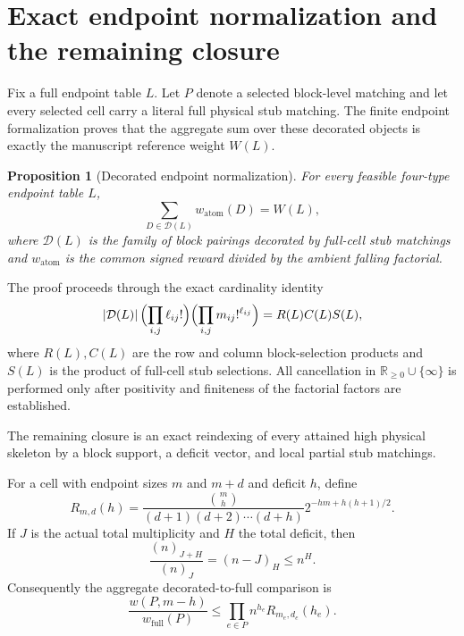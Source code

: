 \documentclass[11pt]{article}
\newtheorem{proposition}[theorem]{Proposition}
\theoremstyle{definition}
\begin{document}
\section{Exact endpoint normalization and the remaining closure}

Fix a full endpoint table $L$.  Let $P$ denote a selected block-level matching
and let every selected cell carry a literal full physical stub matching.
The finite endpoint formalization proves that the aggregate sum over these
decorated objects is exactly the manuscript reference weight $W(L)$.

\begin{proposition}[Decorated endpoint normalization]
\label{prop:endpoint-normalization}
For every feasible four-type endpoint table $L$,
\[
 \sum_{D\in\mathcal D(L)}w_{\mathrm{atom}}(D)=W(L),
\]
where $\mathcal D(L)$ is the family of block pairings decorated by full-cell
stub matchings and $w_{\mathrm{atom}}$ is the common signed reward divided by
the ambient falling factorial.
\end{proposition}

The proof proceeds through the exact cardinality identity
\[
 |\mathcal D(L)|\,
 \Bigl(\prod_{i,j}\ell_{ij}!\Bigr)
 \Bigl(\prod_{i,j}m_{ij}!^{\ell_{ij}}\Bigr)
 =
 R(L)C(L)S(L),
\]
where $R(L),C(L)$ are the row and column block-selection products and $S(L)$
is the product of full-cell stub selections.  All cancellation in
$\mathbb R_{\ge0}\cup\{\infty\}$ is performed only after positivity and
finiteness of the factorial factors are established.

The remaining closure is an exact reindexing of every attained high physical
skeleton by a block support, a deficit vector, and local partial stub
matchings.

For a cell with endpoint sizes $m$ and $m+d$ and deficit $h$, define
\begin{equation}
 R_{m,d}(h)
 =\frac{\binom mh}{(d+1)(d+2)\cdots(d+h)}
 2^{-hm+h(h+1)/2}.
 \label{eq:local-ratio}
\end{equation}
If $J$ is the actual total multiplicity and $H$ the total deficit, then
\begin{equation}
 \frac{(n)_{J+H}}{(n)_J}=(n-J)_H\le n^H.
 \label{eq:global-denominator}
\end{equation}
Consequently the aggregate decorated-to-full comparison is
\begin{equation}
 \frac{w(P,m-h)}{w_{\mathrm{full}}(P)}
 \le\prod_{e\in P}n^{h_e}R_{m_e,d_e}(h_e).
 \label{eq:aggregate-comparison}
\end{equation}
\end{document}
